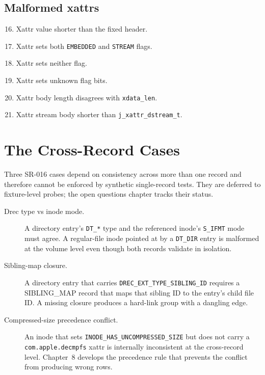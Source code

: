 \subsection{Malformed xattrs}

\begin{enumerate}
  \setcounter{enumi}{15}
  \item Xattr value shorter than the fixed header.
  \item Xattr sets both \texttt{EMBEDDED} and \texttt{STREAM} flags.
  \item Xattr sets neither flag.
  \item Xattr sets unknown flag bits.
  \item Xattr body length disagrees with \texttt{xdata\_len}.
  \item Xattr stream body shorter than \texttt{j\_xattr\_dstream\_t}.
\end{enumerate}

\section{The Cross-Record Cases}

Three SR-016 cases depend on consistency across more than one record
and therefore cannot be enforced by synthetic single-record tests.
They are deferred to fixture-level probes; the open questions chapter
tracks their status.

\begin{description}
  \item[Drec type vs inode mode.] A directory entry's
    \texttt{DT\_*} type and the referenced inode's \texttt{S\_IFMT}
    mode must agree. A regular-file inode pointed at by a
    \texttt{DT\_DIR} entry is malformed at the volume level even
    though both records validate in isolation.
  \item[Sibling-map closure.] A directory entry that carries
    \texttt{DREC\_EXT\_TYPE\_SIBLING\_ID} requires a SIBLING\_MAP
    record that maps that sibling ID to the entry's child file ID.
    A missing closure produces a hard-link group with a dangling
    edge.
  \item[Compressed-size precedence conflict.] An inode that sets
    \texttt{INODE\_HAS\_UNCOMPRESSED\_SIZE} but does not carry a
    \texttt{com.apple.decmpfs} xattr is internally inconsistent at
    the cross-record level. Chapter~8 develops the precedence rule
    that prevents the conflict from producing wrong rows.
\end{description}

